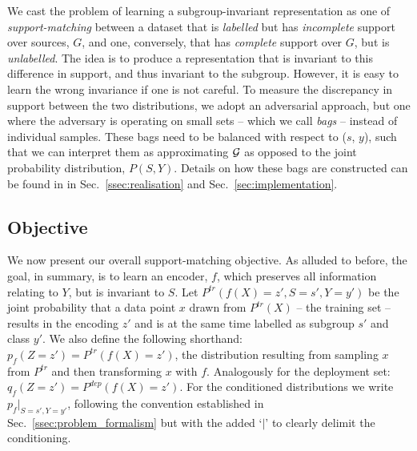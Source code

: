 

We cast the problem of learning a subgroup-invariant representation as one of
\emph{support-matching} between a dataset that is \emph{labelled} but has \emph{incomplete} support
over sources, $G$, and one, conversely, that has \emph{complete} support over $G$, but is
\emph{unlabelled}. 
%
The idea is to produce a representation that is invariant to this difference in support, and thus
invariant to the subgroup. However, it is easy to learn the wrong invariance if one is not careful.
To measure the discrepancy in support between the two distributions, we adopt an adversarial
approach, but one where the adversary is operating on small sets -- which we call \emph{bags} --
instead of individual samples. These bags need to be balanced with respect to ($s$, $y$), such that
we can interpret them as approximating ${\mathcal{G}}$ as opposed to the joint probability distribution,
$P(S, Y)$.
%
Details on how these bags are constructed can be found in in Sec.~\ref{ssec:realisation}
and Sec.~\ref{sec:implementation}.


\subsection{Objective}\label{ssec:objective}
%
We now present our overall support-matching objective. 
%
As alluded to before, the goal, in summary, is to learn an encoder, \(f\), which
preserves all information relating to $Y$, but is invariant to $S$. 
Let \(P^{tr}(f(X)=z', S=s',Y=y')\) be the joint probability that a data point \(x\) drawn
from \(P^{tr}(X)\) -- the training set -- results in the encoding \(z'\) and is at the same
time labelled as subgroup \(s'\) and class \(y'\). 
%
We also define the following shorthand: $p_f(Z=z')=P^{tr}(f(X)=z')$, the distribution
resulting from sampling \(x\) from \(P^{tr}\) and then transforming \(x\) with \(f\).
%
Analogously for the deployment set: $q_f(Z=z')=P^{dep}(f(X)=z')$. 
%
For the conditioned distributions we write $p_f|_{S=s',Y=y'}$, following the convention established
in Sec.~\ref{ssec:problem_formalism} but with the added `\(|\)' to clearly delimit the
conditioning.

